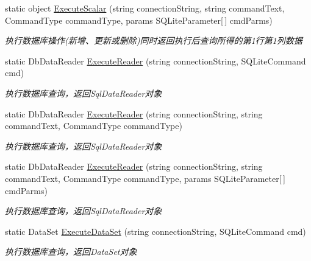 \begin{DoxyCompactItemize}
static object \hyperlink{class_x_c_l_net_tools_1_1_data_base_1_1_s_q_lite_1_1_s_q_lite_helper_ac62255ae8784135b3280db03b6254669}{Execute\-Scalar} (string connection\-String, string command\-Text, Command\-Type command\-Type, params S\-Q\-Lite\-Parameter\mbox{[}$\,$\mbox{]} cmd\-Parms)
\begin{DoxyCompactList}\small\item\em 执行数据库操作(新增、更新或删除)同时返回执行后查询所得的第1行第1列数据 \end{DoxyCompactList}\item 
static Db\-Data\-Reader \hyperlink{class_x_c_l_net_tools_1_1_data_base_1_1_s_q_lite_1_1_s_q_lite_helper_a737c4bac358afea529c32ad69697b0d0}{Execute\-Reader} (string connection\-String, S\-Q\-Lite\-Command cmd)
\begin{DoxyCompactList}\small\item\em 执行数据库查询，返回\-Sql\-Data\-Reader对象 \end{DoxyCompactList}\item 
static Db\-Data\-Reader \hyperlink{class_x_c_l_net_tools_1_1_data_base_1_1_s_q_lite_1_1_s_q_lite_helper_acf0efc58fc87c16e945c497c256ef237}{Execute\-Reader} (string connection\-String, string command\-Text, Command\-Type command\-Type)
\begin{DoxyCompactList}\small\item\em 执行数据库查询，返回\-Sql\-Data\-Reader对象 \end{DoxyCompactList}\item 
static Db\-Data\-Reader \hyperlink{class_x_c_l_net_tools_1_1_data_base_1_1_s_q_lite_1_1_s_q_lite_helper_addf7b420cffcec8709d9dde39268f743}{Execute\-Reader} (string connection\-String, string command\-Text, Command\-Type command\-Type, params S\-Q\-Lite\-Parameter\mbox{[}$\,$\mbox{]} cmd\-Parms)
\begin{DoxyCompactList}\small\item\em 执行数据库查询，返回\-Sql\-Data\-Reader对象 \end{DoxyCompactList}\item 
static Data\-Set \hyperlink{class_x_c_l_net_tools_1_1_data_base_1_1_s_q_lite_1_1_s_q_lite_helper_a41a75d29bd830b9d4b6a3ff672a02f62}{Execute\-Data\-Set} (string connection\-String, S\-Q\-Lite\-Command cmd)
\begin{DoxyCompactList}\small\item\em 执行数据库查询，返回\-Data\-Set对象 \end{DoxyCompactList}\item 

\end{DoxyCompactItemize}

